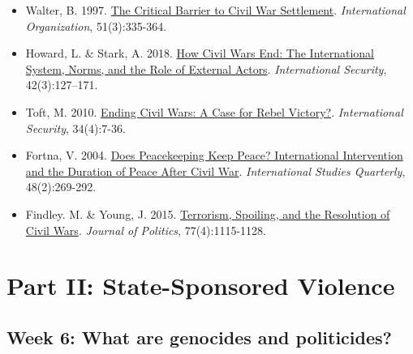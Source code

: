 \documentclass[12pt,]{article}
\providecommand{\tightlist}{%
  \setlength{\itemsep}{0pt}\setlength{\parskip}{0pt}}
\begin{document}
\begin{itemize}
\tightlist
\item
  Walter, B. 1997.
  \href{https://www.cambridge.org/core/journals/international-organization/article/critical-barrier-to-civil-war-settlement/AF2E36B866EC5E658266D01C5B00B42F}{The
  Critical Barrier to Civil War Settlement}. \emph{International
  Organization}, 51(3):335-364.
\item
  Howard, L. \& Stark, A. 2018.
  \href{https://www.mitpressjournals.org/toc/isec/42/3}{How Civil Wars
  End: The International System, Norms, and the Role of External
  Actors}. \emph{International Security}, 42(3):127--171.
\item
  Toft, M. 2010.
  \href{https://www.mitpressjournals.org/doi/abs/10.1162/isec.2010.34.4.7}{Ending
  Civil Wars: A Case for Rebel Victory?}. \emph{International Security},
  34(4):7-36.
\item
  Fortna, V. 2004.
  \href{https://academic.oup.com/isq/article/48/2/269/1888752}{Does
  Peacekeeping Keep Peace? International Intervention and the Duration
  of Peace After Civil War}. \emph{International Studies Quarterly},
  48(2):269-292.
\item
  Findley. M. \& Young, J. 2015.
  \href{https://www.journals.uchicago.edu/doi/abs/10.1086/682400}{Terrorism,
  Spoiling, and the Resolution of Civil Wars}. \emph{Journal of
  Politics}, 77(4):1115-1128.
\end{itemize}

\hypertarget{part-ii-state-sponsored-violence}{%
\section{Part II: State-Sponsored
Violence}\label{part-ii-state-sponsored-violence}}

\hypertarget{week-6-what-are-genocides-and-politicides}{%
\subsection{Week 6: What are genocides and
politicides?}\label{week-6-what-are-genocides-and-politicides}}
\end{document}
